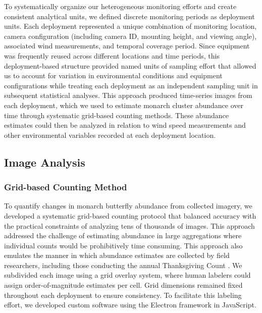To systematically organize our heterogeneous monitoring efforts and create consistent analytical units, we defined discrete monitoring periods as deployment units. Each deployment represented a unique combination of monitoring location, camera configuration (including camera ID, mounting height, and viewing angle), associated wind measurements, and temporal coverage period. Since equipment was frequently reused across different locations and time periods, this deployment-based structure provided named units of sampling effort that allowed us to account for variation in environmental conditions and equipment configurations while treating each deployment as an independent sampling unit in subsequent statistical analyses. This approach produced time-series images from each deployment, which we used to estimate monarch cluster abundance over time through systematic grid-based counting methods. These abundance estimates could then be analyzed in relation to wind speed measurements and other environmental variables recorded at each deployment location.


\subsection{Image Analysis}

\subsubsection{Grid-based Counting Method}

To quantify changes in monarch butterfly abundance from collected imagery, we developed a systematic grid-based counting protocol that balanced accuracy with the practical constraints of analyzing tens of thousands of images. This approach addressed the challenge of estimating abundance in large aggregations where individual counts would be prohibitively time consuming. This approach also emulates the manner in which abundance estimates are collected by field researchers, including those conducting the annual Thanksgiving Count \autocite{xercesProtocolsWesternMonarch2017}. We subdivided each image using a grid overlay system, where human labelers could assign order-of-magnitude estimates per cell. Grid dimensions remained fixed throughout each deployment to ensure consistency. To facilitate this labeling effort, we developed custom software using the Electron framework in JavaScript.

